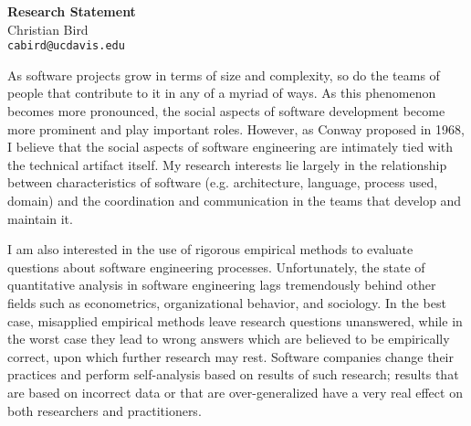 \documentclass[10pt]{article}
\begin{document}
\thispagestyle{fancy}
\lhead{}
\rhead{}
\renewcommand{\headrulewidth}{0pt} 
\renewcommand{\footrulewidth}{0pt} 


\pagestyle{fancy}

\begin{small}

\begin{center}
{\LARGE \bf Research Statement}\\
\vspace*{0.2cm}
{\large Christian Bird}\\
\vspace*{0cm}
\texttt{\normalsize cabird@ucdavis.edu}
\end{center}



As software projects grow in terms of size and complexity, so do the teams of
people that contribute to it in any of a myriad of ways.  As this phenomenon
becomes more pronounced, the social aspects of software development become more
prominent and play important roles.  However, as Conway proposed in 1968, I
believe that the social aspects of software engineering are intimately tied
with the technical artifact itself.  My research interests lie largely in the
relationship between characteristics of software (e.g. architecture, language,
process used, domain) and the coordination and communication in the
teams that develop and maintain it.

I am also interested in the use of rigorous empirical methods to evaluate
questions about software engineering processes.  Unfortunately, the state
of quantitative analysis in software engineering lags tremendously behind
other fields such as econometrics, organizational behavior, and sociology.
In the best case, misapplied empirical methods leave research questions
unanswered, while in the worst case they lead to wrong answers which are believed
to be empirically correct, upon which further research may rest.  Software
companies change their practices and perform self-analysis based on results
of such research; results that are based on incorrect data or that are
over-generalized have a very real effect on both researchers and 
practitioners.


\end{small}
\end{document}
